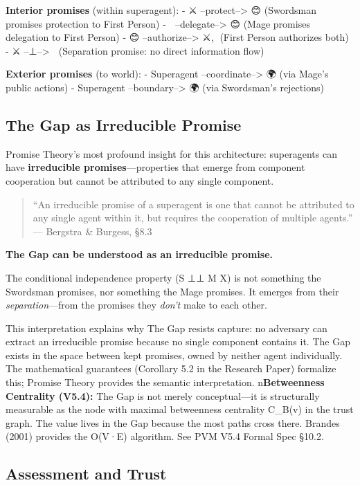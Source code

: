 \documentclass[
  11pt,
]{article}
\begin{document}
\textbf{Interior promises} (within superagent): - ⚔️
--protect--\textgreater{} 😊 (Swordsman promises protection to First
Person) - 🧙 --delegate--\textgreater{} 😊 (Mage promises delegation to
First Person) - 😊 --authorize--\textgreater{} ⚔️,🧙 (First Person
authorizes both) - ⚔️ --⊥--\textgreater{} 🧙 (Separation promise: no
direct information flow)

\textbf{Exterior promises} (to world): - Superagent
--coordinate--\textgreater{} 🌍 (via Mage's public actions) - Superagent
--boundary--\textgreater{} 🌍 (via Swordsman's rejections)

\subsection{The Gap as Irreducible
Promise}\label{the-gap-as-irreducible-promise}

Promise Theory's most profound insight for this architecture:
superagents can have \textbf{irreducible promises}---properties that
emerge from component cooperation but cannot be attributed to any single
component.

\begin{quote}
``An irreducible promise of a superagent is one that cannot be
attributed to any single agent within it, but requires the cooperation
of multiple agents.'' --- Bergstra \& Burgess, §8.3
\end{quote}

\textbf{The Gap can be understood as an irreducible promise.}

The conditional independence property (S ⊥⊥ M \textbar{} X) is not
something the Swordsman promises, nor something the Mage promises. It
emerges from their \emph{separation}---from the promises they
\emph{don't} make to each other.

This interpretation explains why The Gap resists capture: no adversary
can extract an irreducible promise because no single component contains
it. The Gap exists in the space between kept promises, owned by neither
agent individually. The mathematical guarantees (Corollary 5.2 in the
Research Paper) formalize this; Promise Theory provides the semantic
interpretation. n\textbf{Betweenness Centrality (V5.4):} The Gap is not
merely conceptual---it is structurally measurable as the node with
maximal betweenness centrality C\_B(v) in the trust graph. The value
lives in the Gap because the most paths cross there. Brandes (2001)
provides the O(V·E) algorithm. See PVM V5.4 Formal Spec §10.2.

\subsection{Assessment and Trust}\label{assessment-and-trust}
\end{document}
